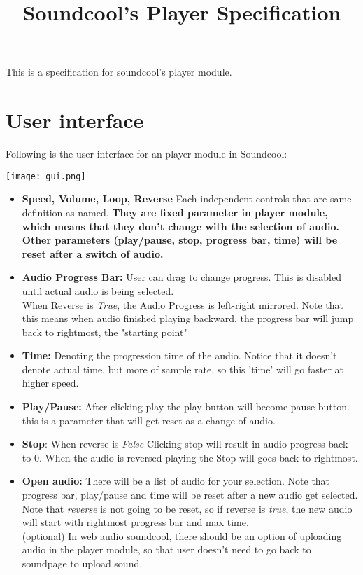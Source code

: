 \documentclass[20pt]{article}
\begin{document}
\title{Soundcool's Player Specification}
\maketitle

This is a specification for soundcool's player module.
\section*{User interface}
Following is the user interface for an player module in Soundcool:

\texttt{[image: gui.png]} 

\begin{itemize}
 \item \textbf{Speed, Volume, Loop, Reverse} Each independent controls that are same definition as named.  \textbf{They are fixed parameter in player module, which means that they don't change with the selection of audio. Other parameters (play/pause, stop, progress bar, time) will be reset after a switch of audio.} 
    \item \textbf{Audio Progress Bar:} User can drag to change progress. This is disabled until actual audio is being selected. \\
    When Reverse is \textit{True}, the Audio Progress is left-right mirrored. Note that this means when audio finished playing backward, the progress bar will jump back to rightmost, the "starting point"
    \item \textbf{Time:} Denoting the progression time of the audio. Notice that it doesn't denote actual time, but more of sample rate, so this 'time' will go faster at higher speed.
    \item \textbf{Play/Pause:} After clicking play the play button will become pause button. this is a parameter that will get reset as a change of audio. 
    \item   \textbf{Stop}: When reverse is \textit{False} Clicking stop will result in audio progress back to 0. When the audio is reversed playing the Stop will goes back to rightmost. 
    \item \textbf{Open audio:} There will be a list of audio for your selection. Note that progress bar, play/pause and time will be reset after a new audio get selected. Note that \textit{reverse} is not going to be reset, so if reverse is \textit{true}, the new audio will start with rightmost progress bar and max time. \\
    (optional) In web audio soundcool, there should be an option of uploading audio in the player module, so that user doesn't need to go back to soundpage to upload sound.
\end{itemize}
\end{document}
